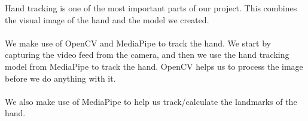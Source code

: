 \documentclass[../paper.tex]{subfiles}
\begin{document}
    Hand tracking is one of the most important parts of our project. 
    This combines the visual image of the hand and the model we created.\\
    \\
    We make use of OpenCV\cite{l0} and MediaPipe\cite{l2} to track the hand.
    We start by capturing the video feed from the camera, and then we use the hand tracking model from MediaPipe to track the hand.
    OpenCV helps us to process the image before we do anything with it.\\
    \\
    We also make use of MediaPipe to help us track/calculate the landmarks of the hand.
\end{document}
